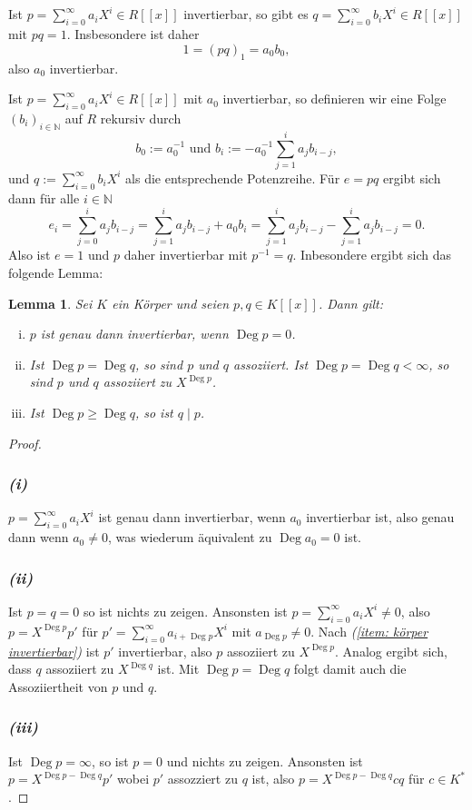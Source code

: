 \documentclass[a4paper,10pt]{article}
\newcounter{satze}
\newtheorem{lem}[satze]{Lemma}
\newcommand{\N}{\mathbb{N}}
\newcommand{\Deg}{\operatorname{Deg}}
\begin{document}
\subsection{}
Ist $p = \sum_{i=0}^\infty a_i X^i \in R[\![x]\!]$ invertierbar, so gibt es $q = \sum_{i=0}^\infty b_i X^i \in R[\![x]\!]$ mit $pq = 1$. Insbesondere ist daher
\[
 1 = (pq)_1 = a_0 b_0,
\]
also $a_0$ invertierbar.

Ist $p = \sum_{i=0}^\infty a_i X^i \in R[\![x]\!]$ mit $a_0$ invertierbar, so definieren wir eine Folge $(b_i)_{i \in \N}$ auf $R$ rekursiv durch
\[
 b_0 := a_0^{-1} \text{ und } b_i := -a_0^{-1} \sum_{j=1}^i a_j b_{i-j},
\]
und $q := \sum_{i=0}^\infty b_i X^i$ als die entsprechende Potenzreihe. Für $e = pq$ ergibt sich dann für alle $i \in \N$
\[
 e_i
 = \sum_{j=0}^i a_j b_{i-j}
 = \sum_{j=1}^i a_j b_{i-j} + a_0 b_i
 = \sum_{j=1}^i a_j b_{i-j} - \sum_{j=1}^i a_j b_{i-j}
 = 0.
\]
Also ist $e = 1$ und $p$ daher invertierbar mit $p^{-1} = q$. Inbesondere ergibt sich das folgende Lemma:

\begin{lem} \label{lem: starkes Lemma}
 Sei $K$ ein Körper und seien $p,q \in K[\![x]\!]$. Dann gilt:
 \begin{enumerate}[(i)]
  \item $p$ ist genau dann invertierbar, wenn $\Deg p = 0$. \label{item: körper invertierbar}
  \item Ist $\Deg p = \Deg q$, so sind $p$ und $q$ assoziiert. Ist $\Deg p = \Deg q < \infty$, so sind $p$ und $q$ assoziiert zu $X^{\Deg p}$.
  \item Ist $\Deg p \geq \Deg q$, so ist $q \mid p$.
 \end{enumerate}
\end{lem}
\begin{proof}
 \subsubsection*{\emph{(i)}}
  $p = \sum_{i=0}^{\infty} a_i X^i$ ist genau dann invertierbar, wenn $a_0$ invertierbar ist, also genau dann wenn $a_0 \neq 0$, was wiederum äquivalent zu $\Deg a_0 = 0$ ist.
 \subsubsection*{\emph{(ii)}}
  Ist $p = q = 0$ so ist nichts zu zeigen. Ansonsten ist $p = \sum_{i=0}^\infty a_i X^i \neq 0$, also $p = X^{\Deg p} p'$ für $p' = \sum_{i=0}^\infty a_{i+\Deg p} X^i$ mit $a_{\Deg p} \neq 0$. Nach \emph{(\ref{item: körper invertierbar})} ist $p'$ invertierbar, also $p$ assoziiert zu $X^{\Deg p}$. Analog ergibt sich, dass $q$ assoziiert zu $X^{\Deg q}$ ist. Mit $\Deg p = \Deg q$ folgt damit auch die Assoziiertheit von $p$ und $q$.
 \subsubsection*{\emph{(iii)}}
 Ist $\Deg p = \infty$, so ist $p = 0$ und nichts zu zeigen. Ansonsten ist $p = X^{\Deg p - \Deg q} p'$ wobei $p'$ assozziert zu $q$ ist, also $p = X^{\Deg p - \Deg q} c q$ für $c \in K^*$.
\end{proof}
\end{document}

